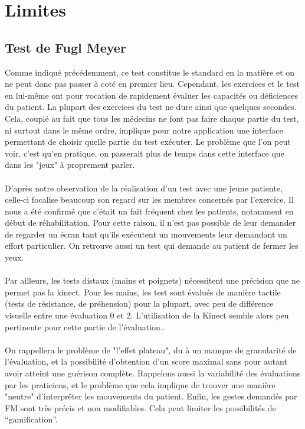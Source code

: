 \documentclass[french,12pt]{report}
\begin{document}
\section{Limites} \label{limites}%
\subsection{Test de Fugl Meyer}
Comme indiqué précédemment, ce test constitue le standard en la matière et on ne peut donc pas passer à coté en premier lieu.
Cependant, les exercices et le test en lui-même ont pour vocation de rapidement évaluer les capacités ou déficiences
du patient. La plupart des exercices du test ne dure ainsi que quelques secondes. Cela, couplé au fait que tous les 
médecins ne font pas faire chaque partie du test, ni surtout dans le même ordre, implique pour notre application une interface permettant de choisir quelle partie du test exécuter. Le problème que l’on peut voir, c'est qu'en pratique, on passerait 
plus de temps dans cette interface que dans les "jeux" à proprement parler.

\paragraph{}
D'après notre observation de la réalisation d'un test avec une jeune patiente, celle-ci focalise 
beaucoup son regard sur les membres concernés par l'exercice. Il nous a été confirmé que c'était un fait fréquent
chez les patients, notamment en début de réhabilitation. Pour cette raison, il n'est pas possible de leur
demander de regarder un écran tant qu'ils exécutent un mouvements leur demandant un effort particulier.
On retrouve aussi un test qui demande au patient de fermer les yeux.

\paragraph{}
Par ailleurs, les tests distaux (mains et poignets) nécessitent une précision que ne permet pas la kinect.
Pour les mains, les test sont évalués de manière tactile (tests de résistance, de préhension) pour la plupart, 
avec peu de différence visuelle entre une évaluation 0 et 2. L’utilisation de la Kinect semble alors 
peu pertinente pour cette partie de l’évaluation..

\paragraph{}
On rappellera le problème de "l'effet plateau", du à un manque de granularité de l'évaluation, et la possibilité
d'obtention d'un score maximal sans pour autant avoir atteint une guérison complète. Rappelons aussi la variabilité
des évaluations par les praticiens, et le problème que cela implique de trouver une manière "neutre" d'interprêter
les mouvements du patient.
Enfin, les gestes demandés par FM sont très précis et non modifiables. Cela peut limiter les possibilités de “gamification”.
		
\end{document}
